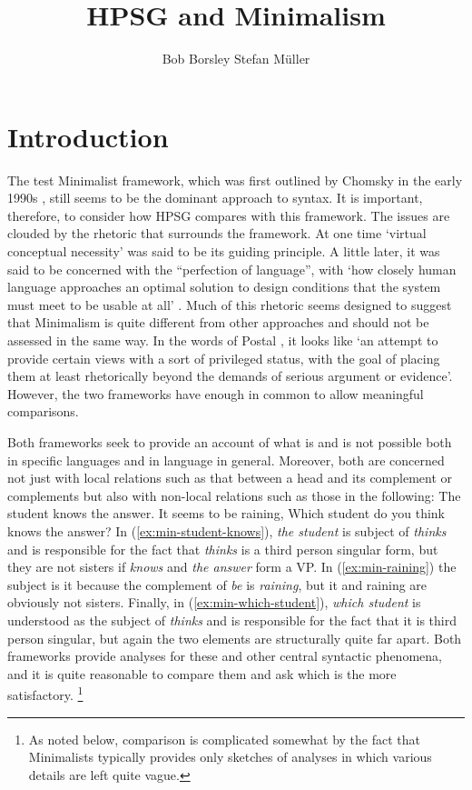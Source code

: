 \documentclass[output=paper]{langsci/langscibook}
\author{%
	Bob Borsley\affiliation{University of Essex}%
	\lastand Stefan Müller\affiliation{Humboldt-Universität zu Berlin}%
}
\title{HPSG and Minimalism}
\begin{document}
\section{Introduction}
\label{sec:min-intro}

The test Minimalist framework, which was first outlined by Chomsky in the early 1990s \citep{Chomsky93b-u,Chomsky95a-u}, still seems to be the dominant approach to syntax. It is important, therefore, to consider how HPSG compares with this framework. The issues are clouded by the rhetoric that surrounds the framework. At one time `virtual conceptual necessity' was said to be its guiding principle. A little later, it was said to be concerned with the ``perfection of language'', with `how closely human language approaches an optimal solution to design conditions that the system must meet to be usable at all' \citet[58]{Chomsky2002a-u}. Much of this rhetoric seems designed to suggest that Minimalism is quite different from other approaches and should not be assessed in the same way. In the words of Postal \citet[19]{Postal2003a}, it looks like `an attempt to provide certain views with a sort of privileged status, with the goal of placing them at least rhetorically beyond the demands of serious argument or evidence'. However, the two frameworks have enough in common to allow meaningful comparisons.


Both frameworks seek to provide an account of what is and is not possible both in specific languages and in language in general. Moreover, both are concerned not just with local relations such as that between a head and its complement or complements but also with non-local relations such as those in the following:
\ea\label{ex:min-student-knows}
The student knows the answer.
\z
\ea\label{ex:min-raining}
It seems to be raining,
\z
\ea\label{ex:min-which-student}
Which student do you think knows the answer? 
\z
In (\ref{ex:min-student-knows}), \textit{the student} is subject of \textit{thinks} and is responsible for the fact that \textit{thinks} is a third person singular form, but they are not sisters if \textit{knows} and \textit{the answer} form a VP. In (\ref{ex:min-raining}) the subject is it because the complement of \textit{be} is \textit{raining}, but it and raining are obviously not sisters. Finally, in (\ref{ex:min-which-student}), \textit{which student} is understood as the subject of \textit{thinks} and is responsible for the fact that it is third person singular, but again the two elements are structurally quite far apart. Both frameworks provide analyses for these and other central syntactic phenomena, and it is quite reasonable to compare them and ask which is the more satisfactory.%
	\footnote{As noted below, comparison is complicated somewhat by the fact that Minimalists typically provides only sketches of analyses in which various details are left quite vague.}%
\end{document}
